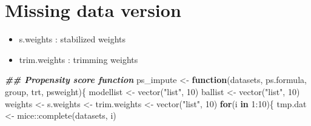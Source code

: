 \documentclass[
]{book}
\newenvironment{Shaded}{\begin{snugshade}}{\end{snugshade}}
\newcommand{\ControlFlowTok}[1]{\textcolor[rgb]{0.13,0.29,0.53}{\textbf{#1}}}
\newcommand{\DecValTok}[1]{\textcolor[rgb]{0.00,0.00,0.81}{#1}}
\newcommand{\DocumentationTok}[1]{\textcolor[rgb]{0.56,0.35,0.01}{\textbf{\textit{#1}}}}
\newcommand{\FunctionTok}[1]{\textcolor[rgb]{0.00,0.00,0.00}{#1}}
\newcommand{\NormalTok}[1]{#1}
\newcommand{\OtherTok}[1]{\textcolor[rgb]{0.56,0.35,0.01}{#1}}
\newcommand{\SpecialCharTok}[1]{\textcolor[rgb]{0.00,0.00,0.00}{#1}}
\newcommand{\StringTok}[1]{\textcolor[rgb]{0.31,0.60,0.02}{#1}}
\providecommand{\tightlist}{%
  \setlength{\itemsep}{0pt}\setlength{\parskip}{0pt}}
\theoremstyle{definition}
\theoremstyle{definition}
\theoremstyle{definition}
\theoremstyle{definition}
\theoremstyle{remark}
\begin{document}
\hypertarget{missing-data-version-1}{%
\section{Missing data version}\label{missing-data-version-1}}

\begin{itemize}
\tightlist
\item
  s.weights : stabilized weights\\
\item
  trim.weights : trimming weights
\end{itemize}

\begin{Shaded}
\begin{Highlighting}[]
\DocumentationTok{\#\# Propensity score function}
\NormalTok{ps\_impute }\OtherTok{\textless{}{-}} \ControlFlowTok{function}\NormalTok{(datasets, ps.formula, group, trt, psweight)\{}
\NormalTok{  modellist }\OtherTok{\textless{}{-}} \FunctionTok{vector}\NormalTok{(}\StringTok{"list"}\NormalTok{, }\DecValTok{10}\NormalTok{)}
\NormalTok{  ballist }\OtherTok{\textless{}{-}} \FunctionTok{vector}\NormalTok{(}\StringTok{"list"}\NormalTok{, }\DecValTok{10}\NormalTok{)}
\NormalTok{  weights }\OtherTok{\textless{}{-}}\NormalTok{ s.weights }\OtherTok{\textless{}{-}}\NormalTok{ trim.weights }\OtherTok{\textless{}{-}} \FunctionTok{vector}\NormalTok{(}\StringTok{"list"}\NormalTok{, }\DecValTok{10}\NormalTok{)}
  \ControlFlowTok{for}\NormalTok{(i }\ControlFlowTok{in} \DecValTok{1}\SpecialCharTok{:}\DecValTok{10}\NormalTok{)\{}
\NormalTok{    tmp.dat }\OtherTok{\textless{}{-}}\NormalTok{ mice}\SpecialCharTok{::}\FunctionTok{complete}\NormalTok{(datasets, i)}
    

\end{Highlighting}
\end{Shaded}
\end{document}
